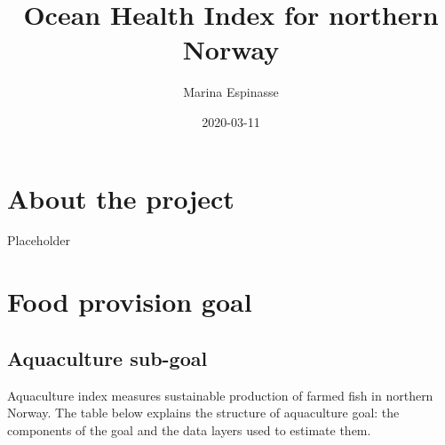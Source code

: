 \documentclass[
]{book}
\title{Ocean Health Index for northern Norway}
\author{Marina Espinasse}
\date{2020-03-11}
\begin{document}
\maketitle

{
\setcounter{tocdepth}{1}
\tableofcontents
}
\hypertarget{about-the-project}{%
\chapter{About the project}\label{about-the-project}}

Placeholder

\hypertarget{food}{%
\chapter{Food provision goal}\label{food}}

\hypertarget{aquaculture-sub-goal}{%
\section{Aquaculture sub-goal}\label{aquaculture-sub-goal}}

Aquaculture index measures sustainable production of farmed fish in northern Norway.
The table below explains the structure of aquaculture goal: the components of the goal and the data layers used to estimate them.
\end{document}
